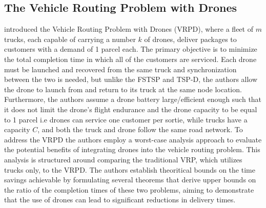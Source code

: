 \documentclass{article}
\begin{document}
	\subsection{The Vehicle Routing Problem with Drones}
	\citeauthor{Wang2017} \cite{Wang2017} introduced the Vehicle Routing Problem with Drones (VRPD), where a ﬂeet of $m$ trucks, each capable of carrying a number $k$ of drones, deliver packages to customers with a demand of 1 parcel each. The primary objective is to minimize the total completion time in which all of the customers are serviced. Each drone must be launched and recovered from the same truck and synchronization between the two is needed, but unlike the FSTSP and TSP-D, the authors allow the drone to launch from and return to its truck at the same node location. Furthermore, the authors assume a drone battery large/efficient enough such that it does not limit the drone's flight endurance and the drone capacity to be equal to 1 parcel i.e drones can service one customer per sortie, while trucks have a capacity $C$, and both the truck and drone follow the same road network. To address the VRPD the authors employ a worst-case analysis approach to evaluate the potential benefits of integrating drones into the vehicle routing problem. This analysis is structured around comparing the traditional VRP, which utilizes trucks only, to the VRPD. The authors establish theoritical bounds on the time savings achievable by formulating several theorems that derive upper bounds on the ratio of the completion times of these two problems, aiming to demonstrate that the use of drones can lead to significant reductions in delivery times.
	\par 
\end{document}

